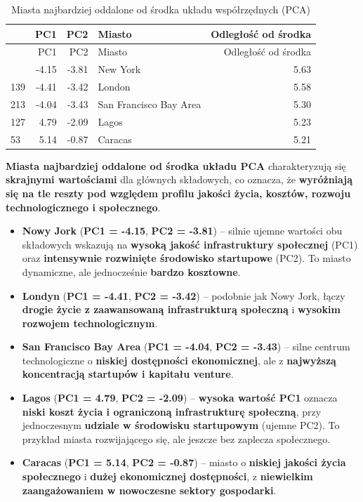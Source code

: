 \documentclass[
  12pt,
]{article}
\begin{document}
\begin{longtable}[]{@{}lrrlr@{}}
\caption{Miasta najbardziej oddalone od środka układu współrzędnych
(PCA)}\tabularnewline
\toprule\noalign{}
& PC1 & PC2 & Miasto & Odległość od środka \\
\midrule\noalign{}
\endfirsthead
\toprule\noalign{}
& PC1 & PC2 & Miasto & Odległość od środka \\
\midrule\noalign{}
\endhead
\bottomrule\noalign{}
\endlastfoot
172 & -4.15 & -3.81 & New York & 5.63 \\
139 & -4.41 & -3.42 & London & 5.58 \\
213 & -4.04 & -3.43 & San Francisco Bay Area & 5.30 \\
127 & 4.79 & -2.09 & Lagos & 5.23 \\
53 & 5.14 & -0.87 & Caracas & 5.21 \\
\end{longtable}

\textbf{Miasta najbardziej oddalone od środka układu PCA} charakteryzują
się \textbf{skrajnymi wartościami} dla głównych składowych, co oznacza,
że \textbf{wyróżniają się na tle reszty pod względem profilu jakości
życia, kosztów, rozwoju technologicznego i społecznego}.

\begin{itemize}
\item
  \textbf{Nowy Jork} (\textbf{PC1 = -4.15}, \textbf{PC2 = -3.81}) --
  silnie ujemne wartości obu składowych wskazują na \textbf{wysoką
  jakość infrastruktury społecznej} (PC1) oraz \textbf{intensywnie
  rozwinięte środowisko startupowe} (PC2). To miasto dynamiczne, ale
  jednocześnie \textbf{bardzo kosztowne}.
\item
  \textbf{Londyn} (\textbf{PC1 = -4.41}, \textbf{PC2 = -3.42}) --
  podobnie jak Nowy Jork, łączy \textbf{drogie życie z zaawansowaną
  infrastrukturą społeczną} i \textbf{wysokim rozwojem technologicznym}.
\item
  \textbf{San Francisco Bay Area} (\textbf{PC1 = -4.04}, \textbf{PC2 =
  -3.43}) -- silne centrum technologiczne o \textbf{niskiej dostępności
  ekonomicznej}, ale z \textbf{najwyższą koncentracją startupów i
  kapitału venture}.
\item
  \textbf{Lagos} (\textbf{PC1 = 4.79}, \textbf{PC2 = -2.09}) --
  \textbf{wysoka wartość PC1} oznacza \textbf{niski koszt życia i
  ograniczoną infrastrukturę społeczną}, przy jednoczesnym
  \textbf{udziale w środowisku startupowym} (ujemne PC2). To przykład
  miasta rozwijającego się, ale jeszcze bez zaplecza społecznego.
\item
  \textbf{Caracas} (\textbf{PC1 = 5.14}, \textbf{PC2 = -0.87}) -- miasto
  o \textbf{niskiej jakości życia społecznego} i \textbf{dużej
  ekonomicznej dostępności}, z \textbf{niewielkim zaangażowaniem w
  nowoczesne sektory gospodarki}.
\end{itemize}
\end{document}
